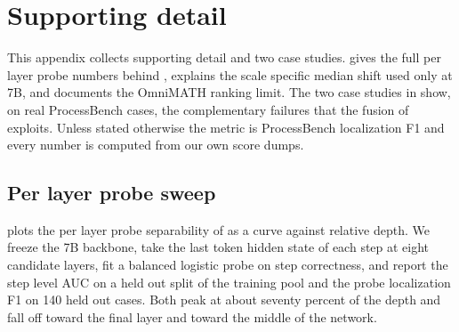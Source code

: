 
\section{Supporting detail}
\label{app:experiments}

This appendix collects supporting detail and two case studies.  gives the full per layer probe numbers behind ,  explains the scale specific median shift used only at 7B, and  documents the OmniMATH ranking limit. The two case studies in  show, on real ProcessBench cases, the complementary failures that the fusion of  exploits. Unless stated otherwise the metric is ProcessBench localization F1 and every number is computed from our own score dumps.

\subsection{Per layer probe sweep}
\label{app:layersweep}

 plots the per layer probe separability of  as a curve against relative depth. We freeze the 7B backbone, take the last token hidden state of each step at eight candidate layers, fit a balanced logistic probe on step correctness, and report the step level AUC on a held out split of the training pool and the probe localization F1 on 140 held out cases. Both peak at about seventy percent of the depth and fall off toward the final layer and toward the middle of the network.

